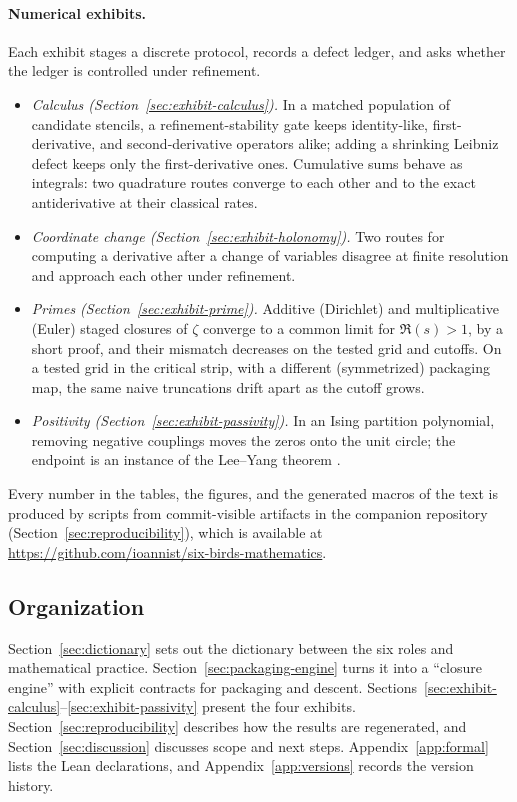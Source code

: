 \paragraph{Numerical exhibits.}
Each exhibit stages a discrete protocol, records a defect ledger, and asks whether the ledger is controlled under refinement.
\begin{itemize}
  \item \emph{Calculus (Section~\ref{sec:exhibit-calculus}).} In a matched population of candidate stencils, a refinement-stability gate keeps identity-like, first-derivative, and second-derivative operators alike; adding a shrinking Leibniz defect keeps only the first-derivative ones. Cumulative sums behave as integrals: two quadrature routes converge to each other and to the exact antiderivative at their classical rates.
  \item \emph{Coordinate change (Section~\ref{sec:exhibit-holonomy}).} Two routes for computing a derivative after a change of variables disagree at finite resolution and approach each other under refinement.
  \item \emph{Primes (Section~\ref{sec:exhibit-prime}).} Additive (Dirichlet) and multiplicative (Euler) staged closures of $\zeta$ converge to a common limit for $\Re(s)>1$, by a short proof, and their mismatch decreases on the tested grid and cutoffs. On a tested grid in the critical strip, with a different (symmetrized) packaging map, the same naive truncations drift apart as the cutoff grows.
  \item \emph{Positivity (Section~\ref{sec:exhibit-passivity}).} In an Ising partition polynomial, removing negative couplings moves the zeros onto the unit circle; the endpoint is an instance of the Lee--Yang theorem \cite{LeeYang1952}.
\end{itemize}

Every number in the tables, the figures, and the generated macros of the text is produced by scripts from commit-visible artifacts in the companion repository (Section~\ref{sec:reproducibility}), which is available at \url{https://github.com/ioannist/six-birds-mathematics}.

\subsection{Organization}
Section~\ref{sec:dictionary} sets out the dictionary between the six roles and mathematical practice.
Section~\ref{sec:packaging-engine} turns it into a ``closure engine'' with explicit contracts for packaging and descent.
Sections~\ref{sec:exhibit-calculus}--\ref{sec:exhibit-passivity} present the four exhibits.
Section~\ref{sec:reproducibility} describes how the results are regenerated, and Section~\ref{sec:discussion} discusses scope and next steps.
Appendix~\ref{app:formal} lists the Lean declarations, and Appendix~\ref{app:versions} records the version history.
